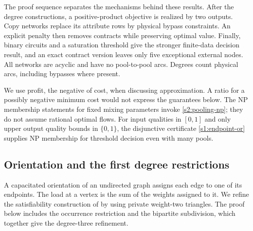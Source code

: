 The proof sequence separates the mechanisms behind these results.
After the degree constructions, a positive-product objective is realized
by two outputs. Copy networks replace its attribute rows by physical
bypass constraints. An explicit penalty then removes contracts while
preserving optimal value. Finally, binary circuits and a saturation
threshold give the stronger finite-data decision result, and an exact
contract version leaves only five exceptional external nodes.
All networks are acyclic and have no pool-to-pool arcs. Degrees count
physical arcs, including bypasses where present.

We use profit, the negative of cost, when discussing approximation. A ratio
for a possibly negative minimum cost would not express the guarantees below.
The NP membership statements for fixed mixing parameters invoke
\cref{s2:pooling-np}; they do not assume rational optimal flows. For
input qualities in $[0,1]$ and only upper output quality bounds in
$\{0,1\}$, the disjunctive certificate \eqref{s1:endpoint-or} supplies
NP membership for threshold decision even with many pools.

\subsection{Orientation and the first degree restrictions}\label{s3:orientation}

A capacitated orientation of an undirected graph assigns each edge to one
of its endpoints. The load at a vertex is the sum of the weights assigned
to it. We refine the satisfiability construction of
\citet[Section~5]{s3:asahiro2011} by using private weight-two triangles.
The proof below includes the occurrence restriction and the bipartite
subdivision, which together give the degree-three refinement.

